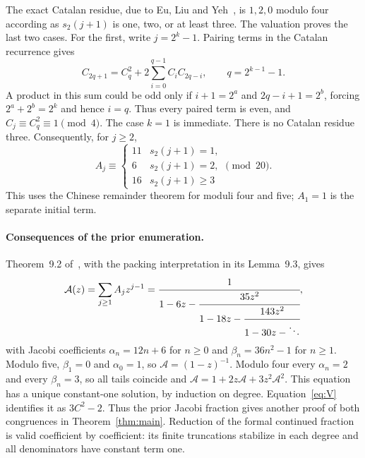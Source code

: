 \documentclass[11pt]{article}
\begin{document}
The exact Catalan residue, due to Eu, Liu and Yeh~\cite[Theorem~2.3]{ELY},
is $1,2,0$ modulo four according as $s_2(j+1)$ is one, two, or
at least three. The valuation proves the last two cases. For the
first, write $j=2^k-1$. Pairing terms in the Catalan recurrence gives
\[
 C_{2q+1}=C_q^2+2\sum_{i=0}^{q-1}C_iC_{2q-i},\qquad
 q=2^{k-1}-1.
\]
A product in this sum could be odd only if
$i+1=2^a$ and $2q-i+1=2^b$, forcing
$2^a+2^b=2^k$ and hence $i=q$. Thus every paired term is even,
and $C_j\equiv C_q^2\equiv1\pmod4$. The case $k=1$ is immediate.
There is no Catalan residue three. Consequently, for $j\geq2$,
\[
 A_j\equiv\begin{cases}
 11&s_2(j+1)=1,\\
 6&s_2(j+1)=2,\\
 16&s_2(j+1)\geq3
 \end{cases}\pmod{20}.
\]
This uses the Chinese remainder theorem for moduli four and five;
$A_1=1$ is the separate initial term.

\paragraph{Consequences of the prior enumeration.}
Theorem~9.2 of~\cite{BKSII}, with the packing interpretation
in its Lemma~9.3, gives
\[
 \mathcal A(z)=\sum_{j\geq1}A_jz^{j-1}
 =\cfrac{1}{1-6z-\cfrac{35z^2}{1-18z-\cfrac{143z^2}{1-30z-\ddots}}},
\]
with Jacobi coefficients $\alpha_n=12n+6$ for $n\geq0$ and
$\beta_n=36n^2-1$ for $n\geq1$. Modulo five, $\beta_1=0$ and $\alpha_0=1$,
so $\mathcal A=(1-z)^{-1}$. Modulo four every $\alpha_n=2$
and every $\beta_n=3$, so all tails coincide and
$\mathcal A=1+2z\mathcal A+3z^2\mathcal A^2$.
This equation has a unique constant-one solution, by induction on
degree. Equation~\eqref{eq:V} identifies it as $3C^2-2$.
Thus the prior Jacobi fraction gives another proof of both
congruences in Theorem~\ref{thm:main}. Reduction of the formal
continued fraction is valid coefficient by coefficient: its finite
truncations stabilize in each degree and all denominators have
constant term one.
\end{document}
